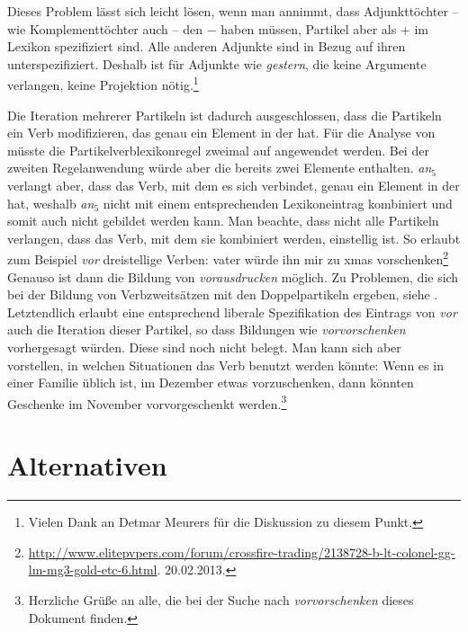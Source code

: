 Dieses Problem lässt sich leicht lösen,
wenn man annimmt, dass Adjunkttöchter -- wie Komplementtöchter auch -- den \lexw{} $-$ haben
müssen, Partikel aber als \lex{}+ im Lexikon spezifiziert sind. Alle anderen Adjunkte
sind in Bezug auf ihren \lexw unterspezifiziert. Deshalb ist für Adjunkte wie \emph{gestern},
die keine Argumente verlangen, keine Projektion nötig.\footnote{
        Vielen Dank an Detmar Meurers für die Diskussion zu diesem Punkt.%
}

Die Iteration mehrerer Partikeln ist dadurch ausgeschlossen, dass die Partikeln ein
Verb modifizieren, das genau ein Element in der \compsl hat.
\z
Für die Analyse von  müsste die Partikelverblexikonregel zweimal auf 
angewendet werden. Bei der zweiten Regelanwendung würde aber die \argstl bereits zwei Elemente
enthalten. \emph{an$_5$} verlangt aber, dass das Verb, mit dem es sich verbindet, genau ein Element in
der \argstl hat, weshalb \emph{an$_5$} nicht mit einem entsprechenden Lexikoneintrag kombiniert und
 somit auch nicht gebildet werden kann. Man beachte, dass nicht alle Partikeln
verlangen, dass das Verb, mit dem sie kombiniert werden, einstellig ist. So erlaubt zum Beispiel
\emph{vor} dreistellige Verben:
\ea
\label{ex-vorschenken}
vater würde ihn mir zu xmas vorschenken\footnote{
  \url{http://www.elitepvpers.com/forum/crossfire-trading/2138728-b-lt-colonel-gg-lm-mg3-gold-etc-6.html}. 20.02.2013.
}
\z
Genauso ist dann die Bildung von \emph{vorausdrucken} möglich. Zu Problemen, die sich bei der
Bildung von Verbzweitsätzen mit den Doppelpartikeln ergeben, siehe
. Letztendlich erlaubt eine entsprechend liberale Spezifikation des Eintrags
von \emph{vor} auch die Iteration dieser Partikel, so dass Bildungen wie \emph{vorvorschenken}
vorhergesagt würden. Diese sind noch nicht belegt. Man kann sich aber vorstellen, in welchen
Situationen das Verb benutzt werden könnte: Wenn es in einer Familie üblich ist, im Dezember etwas
vorzuschenken, dann könnten Geschenke im November vorvorgeschenkt werden.\footnote{
  Herzliche Grüße an alle, die bei der Suche nach \emph{vorvorschenken} dieses Dokument finden.
}


\section{Alternativen}

